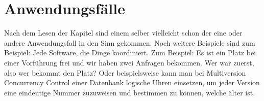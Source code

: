 \documentclass[a4paper,11pt]{report}
\begin{document}
\section{Anwendungsfälle}
Nach dem Lesen der Kapitel sind einem selber vielleicht schon der eine oder andere Anwendungsfall in den Sinn gekommen. Noch weitere Beispiele sind zum Beispiel: Jede Software, die Dinge koordiniert. Zum Beispiel: Es ist ein Platz bei einer Vorführung frei und wir haben zwei Anfragen bekommen. Wer war zuerst, also wer bekommt den Platz? Oder beispielsweise kann man bei Multiversion Concurrency Control einer Datenbank logische Uhren einsetzen, um jeder Version eine eindeutige Nummer zuzuweisen und bestimmen zu können, welche älter ist.
\end{document}
